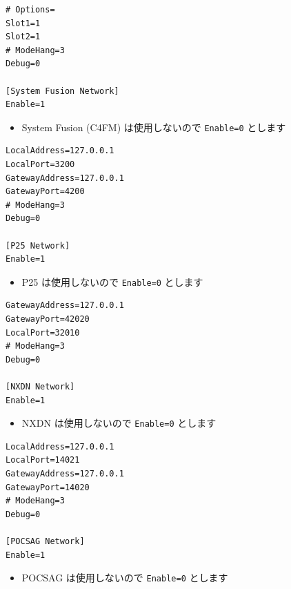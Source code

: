 \documentclass[a4j,oneside]{ujbook}
\begin{document}
\begin{verbatim}
# Options=
Slot1=1
Slot2=1
# ModeHang=3
Debug=0

[System Fusion Network]
Enable=1
\end{verbatim}
\begin{itemize}
 \renewcommand{\labelitemi}{$\triangleright$}
 \item System Fusion (C4FM) は使用しないので \verb+Enable=0+ とします
\end{itemize}
\begin{verbatim}
LocalAddress=127.0.0.1
LocalPort=3200
GatewayAddress=127.0.0.1
GatewayPort=4200
# ModeHang=3
Debug=0

[P25 Network]
Enable=1
\end{verbatim}
\begin{itemize}
 \renewcommand{\labelitemi}{$\triangleright$}
 \item P25 は使用しないので \verb+Enable=0+ とします
\end{itemize}
\begin{verbatim}
GatewayAddress=127.0.0.1
GatewayPort=42020
LocalPort=32010
# ModeHang=3
Debug=0

[NXDN Network]
Enable=1
\end{verbatim}
\begin{itemize}
 \renewcommand{\labelitemi}{$\triangleright$}
 \item NXDN は使用しないので \verb+Enable=0+ とします
\end{itemize}
\begin{verbatim}
LocalAddress=127.0.0.1
LocalPort=14021
GatewayAddress=127.0.0.1
GatewayPort=14020
# ModeHang=3
Debug=0

[POCSAG Network]
Enable=1
\end{verbatim}
\begin{itemize}
 \renewcommand{\labelitemi}{$\triangleright$}
 \item POCSAG は使用しないので \verb+Enable=0+ とします
\end{itemize}
\end{document}
